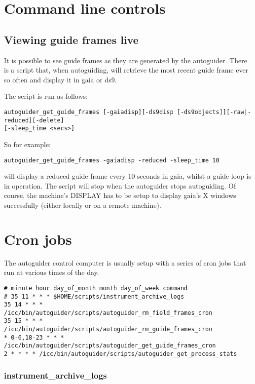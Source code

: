 \documentclass[10pt,a4paper]{article}
\begin{document}
\section{Command line controls}

\subsection{Viewing guide frames live}

It is possible to see guide frames as they are generated by the autoguider. There is a script that, when
autoguiding, will retrieve the most recent guide frame ever so often and display it in gaia or ds9.

The script is run as follows:
\begin{verbatim}
autoguider_get_guide_frames [-gaiadisp][-ds9disp [-ds9objects]][-raw|-reduced][-delete]
[-sleep_time <secs>]
\end{verbatim}

So for example:
\begin{verbatim}
autoguider_get_guide_frames -gaiadisp -reduced -sleep_time 10
\end{verbatim}
will display a reduced guide frame every 10 seconds in gaia, whilst a guide loop is in operation. The script will stop
when the autoguider stops autoguiding. Of course, the machine's DISPLAY has to be setup to display gaia's X windows
successfully (either locally or on a remote machine).

\section{Cron jobs}

The autoguider control computer is usually setup with a series of cron jobs that run at various times of the day.

\begin{verbatim}
# minute hour day_of_month month day_of_week command
# 35 11 * * * $HOME/scripts/instrument_archive_logs
35 14 * * * /icc/bin/autoguider/scripts/autoguider_rm_field_frames_cron
35 15 * * * /icc/bin/autoguider/scripts/autoguider_rm_guide_frames_cron
* 0-6,18-23 * * * /icc/bin/autoguider/scripts/autoguider_get_guide_frames_cron
2 * * * * /icc/bin/autoguider/scripts/autoguider_get_process_stats
\end{verbatim}

\subsubsection{instrument\_archive\_logs}
\end{document}
